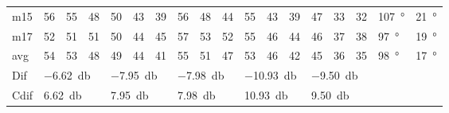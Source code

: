 \begin{table}[H]
\begin{tabular}{l|l|l|l|l|l|l|l|l|l|l|l|l|l|l|l|l|l}
m15  &  56    &  55    &  48    &   50   &   43   &   39   &   56   &  48     & 44     &    55   &   43   &   39   & 47 & 33 & 32 & \SI{107}{\degree} &  \SI{21}{\degree}  \\
m17  & 52     &  51    &  51    &  50    &  44    &    45  &   57   &   53    &  52    &  55     &  46    &   44   & 46 & 37 &  38 & \SI{97}{\degree} & \SI{19}{\degree}   \\ \hline
avg &  54    & 53     &  48    &  49    &  44    &  41    &  55    &   51    &  47    &   53    &   46   &  42    & 45 & 36  & 35 & \SI{98}{\degree} & \SI{17}{\degree}  \\ \hline  
Dif & \multicolumn{3}{l|}{\SI{-6.62}{\decibel}} & \multicolumn{3}{l|}{\SI{-7.95}{\decibel}} & \multicolumn{3}{l|}{\SI{-7.98}{\decibel}} & \multicolumn{3}{l|}{\SI{-10.93}{\decibel}} & \multicolumn{3}{l|}{\SI{-9.50}{\decibel}}      &     \multicolumn{2}{l}{} \\\hline 
Cdif & \multicolumn{3}{l|}{\SI{6.62}{\decibel}} & \multicolumn{3}{l|}{\SI{7.95}{\decibel}} & \multicolumn{3}{l|}{\SI{7.98}{\decibel}} & \multicolumn{3}{l|}{\SI{10.93}{\decibel}} & \multicolumn{3}{l|}{\SI{9.50}{\decibel}}  &   \multicolumn{2}{l}{}                
\end{tabular}
\label{meas:result_cross_5_6}
\end{table}



